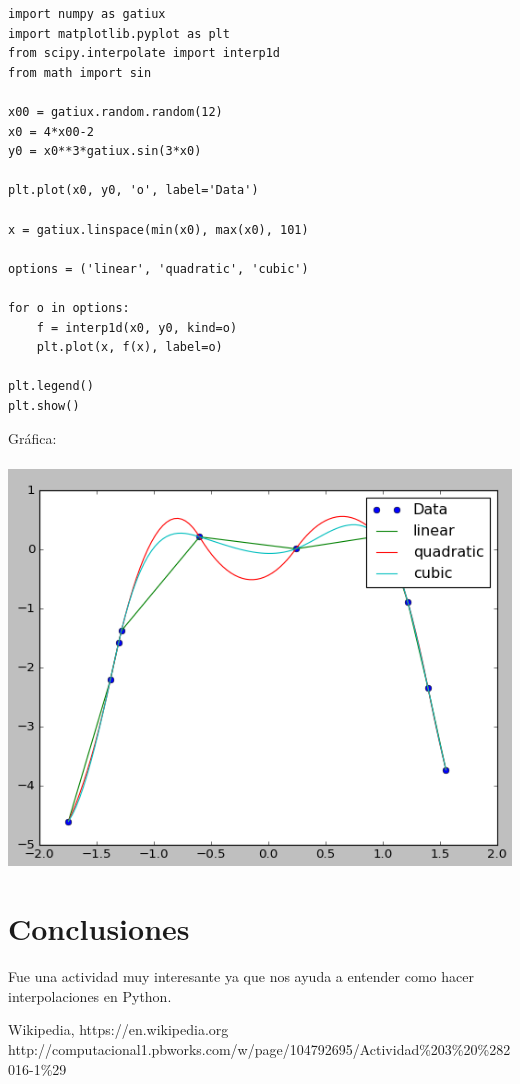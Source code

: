 \documentclass[12pt,letterpaper]{article}
\begin{document}
\begin{verbatim}
import numpy as gatiux
import matplotlib.pyplot as plt
from scipy.interpolate import interp1d
from math import sin

x00 = gatiux.random.random(12)
x0 = 4*x00-2
y0 = x0**3*gatiux.sin(3*x0)

plt.plot(x0, y0, 'o', label='Data')

x = gatiux.linspace(min(x0), max(x0), 101)

options = ('linear', 'quadratic', 'cubic')

for o in options:
    f = interp1d(x0, y0, kind=o)
    plt.plot(x, f(x), label=o)

plt.legend()
plt.show()
\end{verbatim}
Gráfica:\\
\\
\includegraphics[scale=.5]{grafica4act3.png}

\section*{Conclusiones}

Fue una actividad muy interesante ya que nos ayuda a entender como hacer interpolaciones en Python. 


\begin{thebibliography}{widestlabel}
 Wikipedia, https://en.wikipedia.org
 http://computacional1.pbworks.com/w/page/104792695/Actividad\%203\%20\%282016-1\%29
\end{thebibliography}
\end{document}
